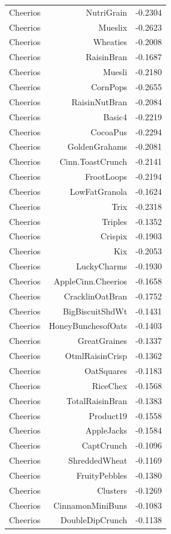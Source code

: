 \begin{longtable}{@{}lrr@{}}
Cheerios & NutriGrain & -0.2304 \\
Cheerios & Mueslix & -0.2623 \\
Cheerios & Wheaties & -0.2008 \\
Cheerios & RaisinBran & -0.1687 \\
Cheerios & Muesli & -0.2180 \\
Cheerios & CornPops & -0.2655 \\
Cheerios & RaisinNutBran & -0.2084 \\
Cheerios & Basic4 & -0.2219 \\
Cheerios & CocoaPus & -0.2294 \\
Cheerios & GoldenGrahams & -0.2081 \\
Cheerios & Cinn.ToastCrunch & -0.2141 \\
Cheerios & FrootLoops & -0.2194 \\
Cheerios & LowFatGranola & -0.1624 \\
Cheerios & Trix & -0.2318 \\
Cheerios & Triples & -0.1352 \\
Cheerios & Crispix & -0.1903 \\
Cheerios & Kix & -0.2053 \\
Cheerios & LuckyCharms & -0.1930 \\
Cheerios & AppleCinn.Cheerios & -0.1658 \\
Cheerios & CracklinOatBran & -0.1752 \\
Cheerios & BigBiscuitShdWt & -0.1431 \\
Cheerios & HoneyBunchesofOats & -0.1403 \\
Cheerios & GreatGraines & -0.1337 \\
Cheerios & OtmlRaisinCrisp & -0.1362 \\
Cheerios & OatSquares & -0.1183 \\
Cheerios & RiceChex & -0.1568 \\
Cheerios & TotalRaisinBran & -0.1383 \\
Cheerios & Product19 & -0.1558 \\
Cheerios & AppleJacks & -0.1584 \\
Cheerios & CaptCrunch & -0.1096 \\
Cheerios & ShreddedWheat & -0.1169 \\
Cheerios & FruityPebbles & -0.1380 \\
Cheerios & Clusters & -0.1269 \\
Cheerios & CinnamonMiniBuns & -0.1083 \\
Cheerios & DoubleDipCrunch & -0.1138 \\

\end{longtable}
